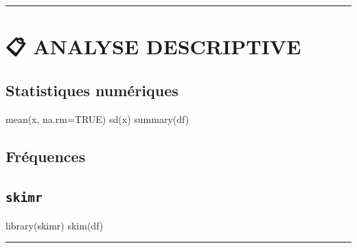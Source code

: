\documentclass[
  8pt,
  letterpaper,
  DIV=11,
  numbers=noendperiod]{scrartcl}
\newenvironment{Shaded}{\begin{snugshade}}{\end{snugshade}}
\newcommand{\AttributeTok}[1]{\textcolor[rgb]{0.40,0.45,0.13}{#1}}
\newcommand{\ConstantTok}[1]{\textcolor[rgb]{0.56,0.35,0.01}{#1}}
\newcommand{\FunctionTok}[1]{\textcolor[rgb]{0.28,0.35,0.67}{#1}}
\newcommand{\NormalTok}[1]{\textcolor[rgb]{0.00,0.23,0.31}{#1}}
\newcommand{\SpecialCharTok}[1]{\textcolor[rgb]{0.37,0.37,0.37}{#1}}
\begin{document}
\begin{center}\rule{0.5\linewidth}{0.5pt}\end{center}

\section{📋 ANALYSE DESCRIPTIVE}\label{analyse-descriptive}

\subsection{Statistiques numériques}\label{statistiques-numuxe9riques}

\begin{Shaded}
\begin{Highlighting}[]
\FunctionTok{mean}\NormalTok{(x, }\AttributeTok{na.rm=}\ConstantTok{TRUE}\NormalTok{)}
\FunctionTok{sd}\NormalTok{(x)}
\FunctionTok{summary}\NormalTok{(df)}
\end{Highlighting}
\end{Shaded}

\subsection{Fréquences}\label{fruxe9quences}

\begin{Shaded}
\end{Shaded}

\subsection{\texorpdfstring{\texttt{skimr}}{skimr}}\label{skimr}

\begin{Shaded}
\begin{Highlighting}[]
\FunctionTok{library}\NormalTok{(skimr)}
\FunctionTok{skim}\NormalTok{(df)}
\end{Highlighting}
\end{Shaded}

\begin{center}\rule{0.5\linewidth}{0.5pt}\end{center}
\end{document}
